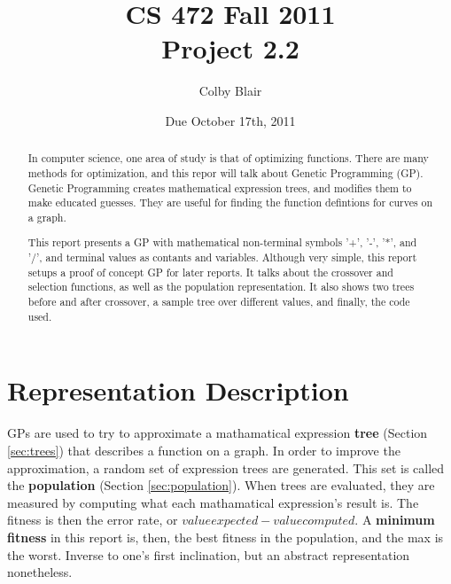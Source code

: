 \documentclass[12pt]{article}
\title{CS 472 Fall 2011 \\
     Project 2.2}
\author{Colby Blair}
\date{Due October 17th, 2011}
\begin{document}
\maketitle

\begin{abstract}
In computer science, one area of study is that of optimizing functions. There are many methods for optimization, and this repor will talk about Genetic Programming (GP). Genetic Programming creates mathematical expression trees, and modifies them to make educated guesses. They are useful for finding the function defintions for curves on a graph. 

This report presents a GP with mathematical non-terminal symbols '+', '-', '*', and '/', and terminal values as contants and variables. Although very simple, this report setups a proof of concept GP for later reports. It talks about the crossover and selection functions, as well as the population representation. It also shows two trees before and after crossover, a sample tree over different values, and finally, the code used.
\end{abstract}

\pagebreak

\tableofcontents

\pagebreak

\listoffigures

\pagebreak

\part{Representation Description}
GPs are used to try to approximate a mathamatical expression \textbf{tree} (Section \ref{sec:trees}) that describes a function on a graph. In order to improve the approximation, a random set of expression trees are generated. This set is called the \textbf{population} (Section \ref{sec:population}). When trees are evaluated, they are measured by computing what each mathamatical expression's result is. The fitness is then the error rate, or $ value expected - value computed $. A \textbf{minimum fitness} in this report is, then, the best fitness in the population, and the max is the worst. Inverse to one's first inclination, but an abstract representation nonetheless.
\end{document}
